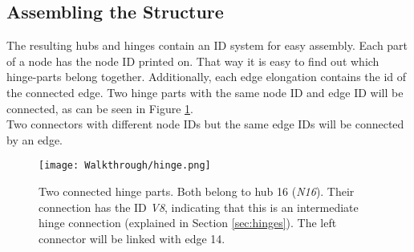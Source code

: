 \subsection{Assembling the Structure}
The resulting hubs and hinges contain an ID system for easy assembly. Each part of a node has the node ID printed on. That way it is easy to find out which hinge-parts belong together. Additionally, each edge elongation contains the id of the connected edge. Two hinge parts with the same node ID and edge ID will be connected, as can be seen in Figure \ref{fig:hinge}.\\
Two connectors with different node IDs but the same edge IDs will be connected by an edge.
\begin{figure}[ht!]
    \texttt{[image: Walkthrough/hinge.png]}
    \centering
    \caption{Two connected hinge parts. Both belong to hub 16 (\textit{N16}). Their connection has the ID \textit{V8}, indicating that this is an intermediate hinge connection (explained in Section \ref{sec:hinges}). The left connector will be linked with edge 14.}
    \label{fig:hinge}
\end{figure}

